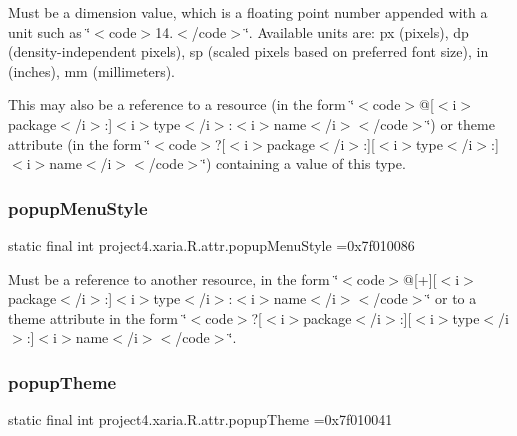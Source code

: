 Must be a dimension value, which is a floating point number appended with a unit such as \char`\"{}$<$code$>$14.\+5sp$<$/code$>$\char`\"{}. Available units are\+: px (pixels), dp (density-\/independent pixels), sp (scaled pixels based on preferred font size), in (inches), mm (millimeters). 

This may also be a reference to a resource (in the form \char`\"{}$<$code$>$@\mbox{[}$<$i$>$package$<$/i$>$\+:\mbox{]}$<$i$>$type$<$/i$>$\+:$<$i$>$name$<$/i$>$$<$/code$>$\char`\"{}) or theme attribute (in the form \char`\"{}$<$code$>$?\mbox{[}$<$i$>$package$<$/i$>$\+:\mbox{]}\mbox{[}$<$i$>$type$<$/i$>$\+:\mbox{]}$<$i$>$name$<$/i$>$$<$/code$>$\char`\"{}) containing a value of this type. \mbox{\label{classproject4_1_1xaria_1_1R_1_1attr_afb866473cf6d66314b30642709afb1b5}} 
\subsubsection{\texorpdfstring{popup\+Menu\+Style}{popupMenuStyle}}
{\footnotesize\ttfamily static final int project4.\+xaria.\+R.\+attr.\+popup\+Menu\+Style =0x7f010086\hspace{0.3cm}{\ttfamily [static]}}

Must be a reference to another resource, in the form \char`\"{}$<$code$>$@\mbox{[}+\mbox{]}\mbox{[}$<$i$>$package$<$/i$>$\+:\mbox{]}$<$i$>$type$<$/i$>$\+:$<$i$>$name$<$/i$>$$<$/code$>$\char`\"{} or to a theme attribute in the form \char`\"{}$<$code$>$?\mbox{[}$<$i$>$package$<$/i$>$\+:\mbox{]}\mbox{[}$<$i$>$type$<$/i$>$\+:\mbox{]}$<$i$>$name$<$/i$>$$<$/code$>$\char`\"{}. \mbox{\label{classproject4_1_1xaria_1_1R_1_1attr_a06bffca943d147734a40eb273589957d}} 
\subsubsection{\texorpdfstring{popup\+Theme}{popupTheme}}
{\footnotesize\ttfamily static final int project4.\+xaria.\+R.\+attr.\+popup\+Theme =0x7f010041\hspace{0.3cm}{\ttfamily [static]}}

